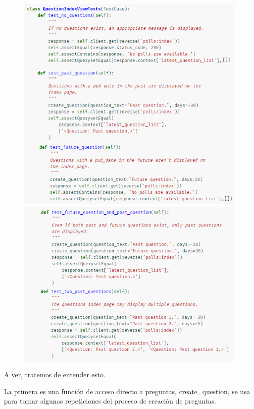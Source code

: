 \documentclass[10pt]{article}
\begin{document}
\begin{figure}[H]
\begin{center}
\includegraphics[scale=0.8]{figuras/3/35/357/img7.png}
\includegraphics[scale=0.8]{figuras/3/35/357/img8.png}
\end{center}
\end{figure}

A ver, tratemos de entender esto. 

La primera es una función de acceso directo a preguntas, \textcolor{G}{create\_question}, se usa para tomar algunas repeticiones del proceso de creación de preguntas.
\end{document}
